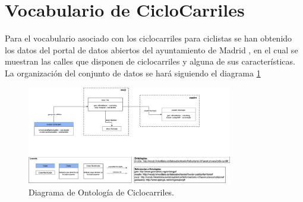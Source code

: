 \section{Vocabulario de CicloCarriles}

Para el vocabulario asociado con los ciclocarriles para ciclistas se han obtenido los datos del portal de datos abiertos del ayuntamiento de Madrid \cite{datosMadrid_ciclocarriles}, en el cual se muestran las calles que disponen de ciclocarriles y alguna de sus características.
\newline
\newline
La organización del conjunto de datos se hará siguiendo el diagrama \ref{fig:diagramaOntologCicloCarr}

\begin{figure}[h]
	\centering
		\includegraphics[angle=0, width=0.8\textwidth]{images/diagramaCicloCarril.png}  
	\caption{Diagrama de Ontología de Ciclocarriles.}
	\label{fig:diagramaOntologCicloCarr}
\end{figure}





